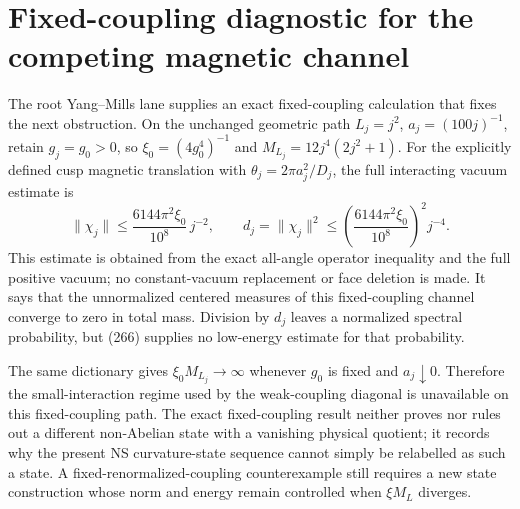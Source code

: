 \section{Fixed-coupling diagnostic for the competing magnetic channel}
\label{sec:fixed-coupling-diagnostic}

The root Yang--Mills lane supplies an exact fixed-coupling calculation that fixes the next obstruction.  On the unchanged geometric path $L_j=j^2$, $a_j=(100j)^{-1}$, retain $g_j=g_0>0$, so $\xi_0=(4g_0^4)^{-1}$ and $M_{L_j}=12j^4(2j^2+1)$.  For the explicitly defined cusp magnetic translation with $\theta_j=2\pi a_j^2/D_j$, the full interacting vacuum estimate is
\[
 \|\chi_j\|\le \frac{6144\pi^2\xi_0}{10^8}\,j^{-2},
 \qquad
 d_j=\|\chi_j\|^2\le
 \left(\frac{6144\pi^2\xi_0}{10^8}\right)^2j^{-4}.
 \tag{266}
\]
This estimate is obtained from the exact all-angle operator inequality and the full positive vacuum; no constant-vacuum replacement or face deletion is made.  It says that the unnormalized centered measures of this fixed-coupling channel converge to zero in total mass.  Division by $d_j$ leaves a normalized spectral probability, but (266) supplies no low-energy estimate for that probability.

The same dictionary gives $\xi_0M_{L_j}\to\infty$ whenever $g_0$ is fixed and $a_j\downarrow0$.  Therefore the small-interaction regime used by the weak-coupling diagonal is unavailable on this fixed-coupling path.  The exact fixed-coupling result neither proves nor rules out a different non-Abelian state with a vanishing physical quotient; it records why the present NS curvature-state sequence cannot simply be relabelled as such a state.  A fixed-renormalized-coupling counterexample still requires a new state construction whose norm and energy remain controlled when $\xi M_L$ diverges.



